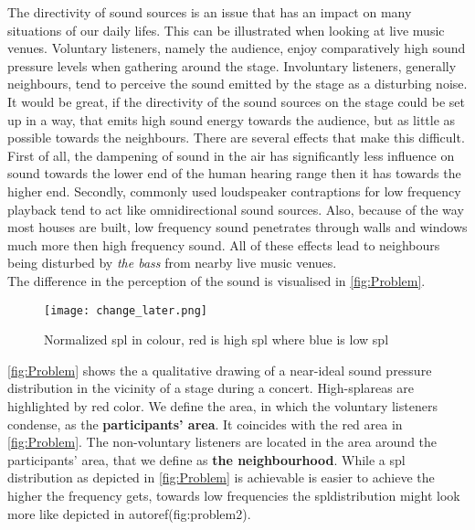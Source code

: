 
The directivity of sound sources is an issue that has an impact on many situations of our daily lifes. This can be illustrated when looking at live music venues. Voluntary listeners, namely the audience, enjoy comparatively high sound pressure levels when gathering around the stage. Involuntary listeners, generally neighbours, tend to perceive the sound emitted by the stage as a disturbing noise. It would be great, if the directivity of the sound sources on the stage could be set up in a way, that emits high sound energy towards the audience, but as little as possible towards the neighbours. There are several effects that make this difficult. First of all, the dampening of sound in the air has significantly less influence on sound towards the lower end of the human hearing range then it has towards the higher end. Secondly, commonly used loudspeaker contraptions for low frequency playback tend to act like omnidirectional sound sources. Also, because of the way most houses are built, low frequency sound penetrates through walls and windows much more then high frequency sound. All of these effects lead to neighbours being disturbed by \textit{the bass} from nearby live music venues.\\
The difference in the perception of the sound is visualised in \autoref{fig:Problem}.


\begin{figure}[htbp]
	\centering
	\texttt{[image: change\_later.png]}
	\caption{Normalized \gls{spl} in colour, red is high \gls{spl} where blue is low \gls{spl}}
		\label{fig:Problem}
\end{figure}

\autoref{fig:Problem} shows the a qualitative drawing of a near-ideal sound pressure distribution in the vicinity of a stage during a concert. High-\gls{spl}areas are highlighted by red color. 
We define the area, in which the voluntary listeners condense,  as the \textbf{participants' area}. It coincides with the red area in \autoref{fig:Problem}. The non-voluntary listeners are located in the area around the participants' area, that we define as \textbf{the neighbourhood}. While a \gls{spl} distribution as depicted in \autoref{fig:Problem} is achievable is easier to achieve the higher the frequency gets, towards low frequencies the \gls{spl}distribution might look more like depicted in autoref(fig:problem2).

